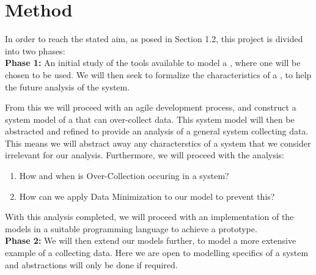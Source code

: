 \chapter{Method}

In order to reach the stated aim, as posed in Section 1.2, this project is divided into two phases: \\

\textbf{Phase 1:} An initial study of the tools available to model a \wsn, where one will be chosen to be used. We will then seek to formalize the characteristics of a \wsn, to help the future analysis of the system. 

From this we will proceed with an agile development process, and construct a system model of a \wsn that can over-collect data. This system model will then be abstracted and refined to provide an analysis of a general system collecting data. This means we will abstract away any characterstics of a system that we consider irrelevant for our analysis. Furthermore, we will proceed with the analysis: \\


\begin{enumerate}
	\setlength\itemsep{1em}
	\item How and when is Over-Collection occuring in a system? 
	\item How can we apply Data Minimization to our model to prevent this? \\
\end{enumerate}

With this analysis completed, we will proceed with an implementation of the models in a suitable programming language to achieve a prototype. \\









\textbf{Phase 2:} We will then extend our models further, to model a more extensive example of a \wsn collecting data. Here we are open to modelling specifics of a system and abstractions will only be done if required. \\

